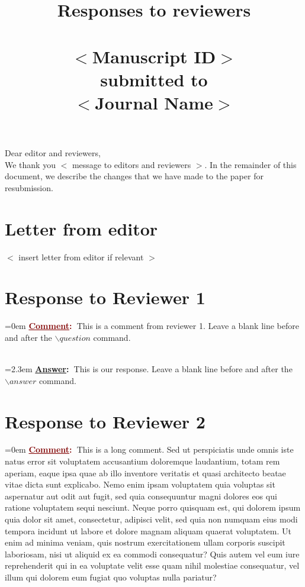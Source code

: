 \documentclass{article}
\newcommand{\question}[0]{\vspace{1em} \noindent \hangindent=0em \textbf{\textcolor{Maroon}{\uline{Comment}:~}}}
\newcommand{\answer}[0]{\\\vspace{0.1em} \hangindent=2.3em \textbf{\textcolor{NavyBlue}{\uline{Answer}:~}}}
\begin{document}
\title{Responses to reviewers\\~\\$<$Manuscript ID$>$\\submitted to\\$<$Journal Name$>$}

\subtitle{}

\maketitle
\noindent Dear editor and reviewers,\\

\noindent We thank you $<$ message to editors and reviewers $>$.
In the remainder of this document, we describe the changes that we have made to the paper for resubmission.

\section{Letter from editor}

$<$ insert letter from editor if relevant $>$

\section{Response to Reviewer 1}

\question This is a comment from reviewer 1. Leave a blank line before and after the $\backslash question$ command.

\answer This is our response. Leave a blank line before and after the $\backslash answer$ command.

\section{Response to Reviewer 2}

\question This is a long comment. Sed ut perspiciatis unde omnis iste natus error sit voluptatem accusantium doloremque laudantium, totam rem aperiam, eaque ipsa quae ab illo inventore veritatis et quasi architecto beatae vitae dicta sunt explicabo. Nemo enim ipsam voluptatem quia voluptas sit aspernatur aut odit aut fugit, sed quia consequuntur magni dolores eos qui ratione voluptatem sequi nesciunt. Neque porro quisquam est, qui dolorem ipsum quia dolor sit amet, consectetur, adipisci velit, sed quia non numquam eius modi tempora incidunt ut labore et dolore magnam aliquam quaerat voluptatem. Ut enim ad minima veniam, quis nostrum exercitationem ullam corporis suscipit laboriosam, nisi ut aliquid ex ea commodi consequatur? Quis autem vel eum iure reprehenderit qui in ea voluptate velit esse quam nihil molestiae consequatur, vel illum qui dolorem eum fugiat quo voluptas nulla pariatur?
\end{document}
